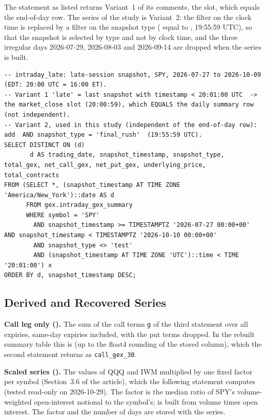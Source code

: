 The statement as listed returns Variant~1 of its comments, the  slot, which equals the end-of-day row. The series of the study is Variant~2: the filter on the clock time is replaced by a filter on the snapshot type ( equal to , 19:55:59 UTC), so that the snapshot is selected by type and not by clock time, and the three irregular days 2026-07-29, 2026-08-03 and 2026-09-14 are dropped when the series is built.

\begin{lstlisting}[style=appcode]
-- intraday_late: late-session snapshot, SPY, 2026-07-27 to 2026-10-09 (EDT: 20:00 UTC = 16:00 ET).
-- Variant 1 'late' = last snapshot with timestamp < 20:01:00 UTC  -> the market_close slot (20:00:59), which EQUALS the daily summary row (not independent).
-- Variant 2, used in this study (independent of the end-of-day row): add  AND snapshot_type = 'final_rush'  (19:55:59 UTC).
SELECT DISTINCT ON (d)
       d AS trading_date, snapshot_timestamp, snapshot_type, total_gex, net_call_gex, net_put_gex, underlying_price, total_contracts
FROM (SELECT *, (snapshot_timestamp AT TIME ZONE 'America/New_York')::date AS d
      FROM gex.intraday_gex_summary
      WHERE symbol = 'SPY'
        AND snapshot_timestamp >= TIMESTAMPTZ '2026-07-27 00:00+00' AND snapshot_timestamp < TIMESTAMPTZ '2026-10-10 00:00+00'
        AND snapshot_type <> 'test'
        AND (snapshot_timestamp AT TIME ZONE 'UTC')::time < TIME '20:01:00') x
ORDER BY d, snapshot_timestamp DESC;
\end{lstlisting}

\subsection{Derived and Recovered Series}
\label{app:series:derived}

\textbf{Call leg only ().} The sum of the call terms \texttt{g} of the third statement over all expiries, same-day expiries included, with the put terms dropped. In the rebuilt summary table this is  (up to the float4 rounding of the stored column), which the second statement returns as \texttt{call\_gex\_30}.

\textbf{Scaled series ().} The  values of QQQ and IWM multiplied by one fixed factor per symbol (Section~3.6 of the article), which the following statement computes (tested read-only on 2026-10-29). The factor is the median ratio of SPY's volume-weighted open-interest notional to the symbol's;  is built from volume times open interest. The factor and the number of days are stored with the series.

